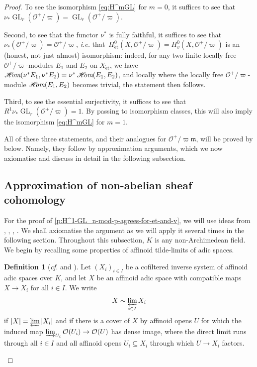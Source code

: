 \documentclass[10pt,a4paper]{article}
\theoremstyle{definition}
\newtheorem{Definition}[thm]{Definition}
\theoremstyle{remark}
\renewcommand{\O}{\mathcal{O}}
\newcommand{\m}{\mathfrak{m}}
\newcommand{\GL}{\operatorname{GL}}
\newcommand{\et}{{\operatorname{\acute{e}t}}}
\DeclareMathOperator{\HOM}{\mathscr{H}\hspace{-0.3em}\mathrm{\textit{om}}}
\numberwithin{equation}{section}
\begin{document}
\begin{proof}
	To see the isomorphism  \eqref {eq:H^mGL} for $m=0$, it suffices to see that $\nu_{\ast}\GL_r(\O^+/\varpi)=\GL_r(\O^+/\varpi)$.
	
	Second, to see that the functor $\nu^\ast$ is fully faithful, it suffices to see that $\nu_{\ast}(\O^+/\varpi)=\O^+/\varpi$, \textit{i.e.} that~$H^0_{\et}(X,\O^+/\varpi)=H^0_{v}(X,\O^+/\varpi)$
	is an (honest, not just almost) isomorphism:
	indeed, for any two finite locally free $\O^+/\varpi$-modules $E_1$ and $E_2$ on $X_{\et}$, we have $\HOM(\nu^{\ast}E_1,\nu^{\ast}E_2)=\nu^{\ast}\HOM(E_1,E_2)$, and locally where the locally free $\O^+/\varpi$-module $\HOM(E_1,E_2)$ becomes trivial, the statement then follows.
	
	Third, to see the essential surjectivity, it suffices to see that $R^1\nu_{\ast}\GL_r(\O^+/\varpi)=1$. By passing to isomorphism classes, this will also imply the isomorphism \eqref{eq:H^mGL} for $m=1$.
	
	All of these three statements, and their analogues for $\O^+/\varpi\m$, will be proved by  below. Namely, they follow by approximation arguments, which we now axiomatise and discuss in detail in the following subsection.
	
	\subsection{Approximation of non-abelian sheaf cohomology}\label{s:approximation}
	For the proof of \cref{p:H^1-GL_n-mod-p-agrees-for-et-and-v}, we will use ideas from \cite[Section~3]{Scholze_p-adicHodgeForRigid}, \cite[Proposition~14.7]{etale-cohomology-of-diamonds}, \cite[Section~2]{MannWerner_LocSys_p-adVB}, \cite[Theorem 2.18]{heuer-Picard-good-reduction}. We  shall axiomatise the argument as we will apply it several times in the following section. Throughout this subsection, $K$ is any non-Archimedean field.
	We begin by recalling some properties of affinoid tilde-limits of adic spaces.
        
	\begin{Definition}[\textit{cf.} {\cite[Equation~(2.4.1)]{huber2013etale} and \cite[Section~2.4]{ScholzeWeinstein}}]\label{d:tilde-limits}
		Let  $(X_i)_{i\in I}$ be a cofiltered inverse system of affinoid adic spaces over $K$, and let $X$ be an affinoid adic space with compatible maps $X\to X_i$ for all $i\in I$. We write
		\[ X\sim \varprojlim_{i\in I} X_i\]
		if $|X|=\varprojlim |X_i|$ and if there is a cover of $X$ by affinoid opens $U$ for which the induced map $\varinjlim_{U_i}\O(U_i)\to \O(U)$
		has dense image, where the direct limit runs through all $i\in I$ and all affinoid opens  $U_i\subseteq X_i$ through which $U\to X_i$ factors.
	\end{Definition}


\end{proof}
\end{document}
